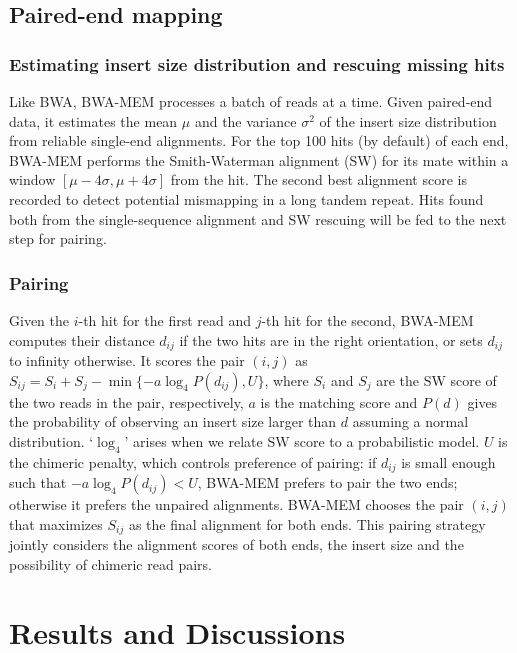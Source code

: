 \documentclass{bioinfo}
\begin{document}
\begin{methods}
\subsection{Paired-end mapping}

\subsubsection{Estimating insert size distribution and rescuing missing hits}
Like BWA, BWA-MEM processes a batch of reads at a time.  Given paired-end data,
it estimates the mean $\mu$ and the variance $\sigma^2$ of the insert size
distribution from reliable single-end alignments. For the top 100 hits (by
default) of each end, BWA-MEM performs the Smith-Waterman alignment (SW) for
its mate within a window $[\mu-4\sigma,\mu+4\sigma]$ from the hit. The second
best alignment score is recorded to detect potential mismapping in a long
tandem repeat.  Hits found both from the single-sequence alignment and SW
rescuing will be fed to the next step for pairing.

\subsubsection{Pairing} Given the $i$-th hit for the first read and $j$-th hit
for the second, BWA-MEM computes their distance $d_{ij}$ if the two hits are in
the right orientation, or sets $d_{ij}$ to infinity otherwise. It scores the
pair $(i,j)$ as $S_{ij}=S_i+S_j-\min\{-a\log_4 P(d_{ij}),U\}$, where $S_i$ and
$S_j$ are the SW score of the two reads in the pair, respectively, $a$ is the
matching score and $P(d)$ gives the probability of observing an insert size
larger than $d$ assuming a normal distribution. `$\log_4$' arises when we
relate SW score to a probabilistic model. $U$ is the chimeric penalty,
which controls preference of pairing: if $d_{ij}$ is small enough such
that $-a\log_4 P(d_{ij})<U$, BWA-MEM prefers to pair the two ends; otherwise
it prefers the unpaired alignments. BWA-MEM chooses the pair $(i,j)$ that
maximizes $S_{ij}$ as the final alignment for both ends.
This pairing strategy jointly considers the alignment scores of both ends,
the insert size and the possibility of chimeric read pairs.

\end{methods}

\section{Results and Discussions}
\end{document}
